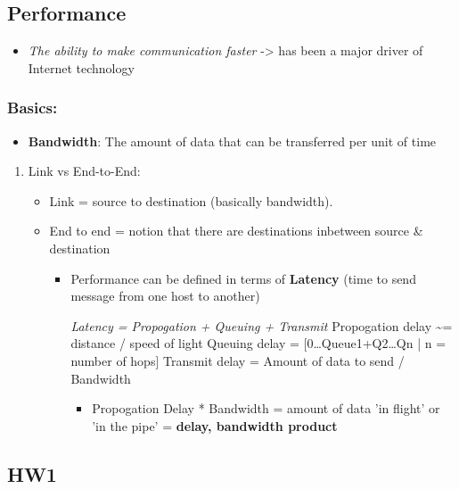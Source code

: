 \documentclass[11pt]{article}
\begin{document}
\subsection{Performance}
\label{sec:orgheadline18}
\begin{itemize}
\item \emph{The ability to make communication faster} -> has been a major driver of
Internet technology
\end{itemize}

\subsubsection{Basics:}
\label{sec:orgheadline17}
\begin{itemize}
\item \textbf{Bandwidth}: The amount of data that can be transferred per unit of time
\end{itemize}

\begin{enumerate}
\item Link vs End-to-End:
\label{sec:orgheadline16}
\begin{itemize}
\item Link = source to destination (basically bandwidth).
\item End to end = notion that there are destinations inbetween source \&
destination
\begin{itemize}
\item Performance can be defined in terms of \textbf{Latency} (time to send message
from one host to another)

\emph{Latency = Propogation + Queuing + Transmit}
Propogation delay \textasciitilde{}= distance / speed of light
Queuing delay = [0\ldots{}Queue1+Q2\ldots{}Qn | n = number of hops]
Transmit delay = Amount of data to send / Bandwidth

\begin{itemize}
\item Propogation Delay * Bandwidth = amount of data 'in flight' or 'in
the pipe' = \textbf{delay, bandwidth product}
\end{itemize}
\end{itemize}
\end{itemize}
\end{enumerate}
\subsection{HW1}
\label{sec:orgheadline19}
\end{document}
